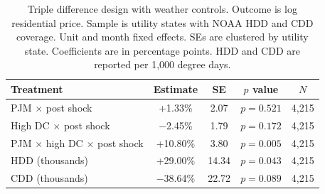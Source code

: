 \begin{table}[H]
\centering
\caption{Triple difference design with weather controls. Outcome is log residential price. Sample is utility states with NOAA HDD and CDD coverage. Unit and month fixed effects. SEs are clustered by utility state. Coefficients are in percentage points. HDD and CDD are reported per 1{,}000 degree days.}
\label{tab:robustness}
\begin{tabular}{p{7cm} c c c c}
\toprule
Treatment & Estimate & SE & $p$ value & $N$ \\
\midrule
PJM \(\times\) post shock & +1.33\% & 2.07 & $p=0.521$ & 4,215 \\
High DC \(\times\) post shock & $-$2.45\% & 1.79 & $p=0.172$ & 4,215 \\
PJM \(\times\) high DC \(\times\) post shock & +10.80\% & 3.80 & $p=0.005$ & 4,215 \\
HDD (thousands) & +29.00\% & 14.34 & $p=0.043$ & 4,215 \\
CDD (thousands) & $-$38.64\% & 22.72 & $p=0.089$ & 4,215 \\
\bottomrule
\end{tabular}
\end{table}
